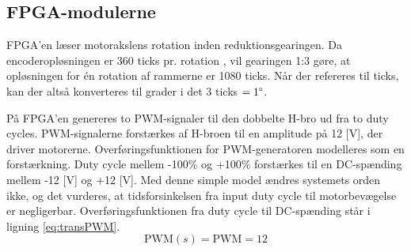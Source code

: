 \subsection{FPGA-modulerne}
\label{subsec:matFPGA}
FPGA'en læser motorakslens rotation inden reduktionsgearingen.
Da encoderopløsningen er 360 ticks pr. rotation \citep{emgmotor},
vil gearingen 1:3 gøre, at opløsningen for én rotation af rammerne er 1080 ticks.
Når der refereres til ticks, kan der altså konverteres til grader i det \(3\) ticks \( = 1 \degree\).

På FPGA'en genereres to PWM-signaler til den dobbelte H-bro ud fra to
duty cycles.
PWM-signalerne forstærkes af H-broen til en amplitude på 12 [V],
der driver motorerne.
Overføringsfunktionen for PWM-generatoren %
modelleres som en forstærkning. 
Duty cycle mellem -100\% og +100\% forstærkes
til en DC-spænding mellem -12 [V] og +12 [V]. Med denne simple model ændres systemets orden ikke,
og det vurderes, at tidsforsinkelsen fra input duty cycle til motorbevægelse er negligerbar.
Overføringsfunktionen fra duty cycle til DC-spænding står i ligning \ref{eq:transPWM}.
\begin{equation}
	\text{PWM}\left(s\right)=\text{PWM}=12
	\label{eq:transPWM}
\end{equation}

